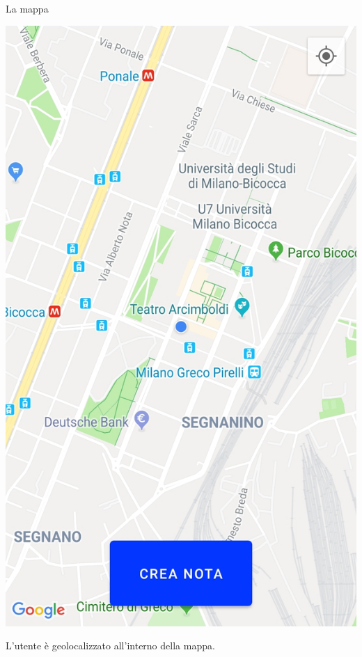 \documentclass[11pt,aspectratio=169]{beamer}
\begin{document}
\begin{frame}{La mappa}
\noindent
    \begin{minipage}{0.3\textwidth}
    \includegraphics[scale=0.1]{Tesi/images/Mappa.jpg}
    \end{minipage}
\hfill
\begin{minipage}{0.6\textwidth}
L'utente è geolocalizzato all'interno della mappa.
\end{minipage}
\end{frame}
\end{document}
